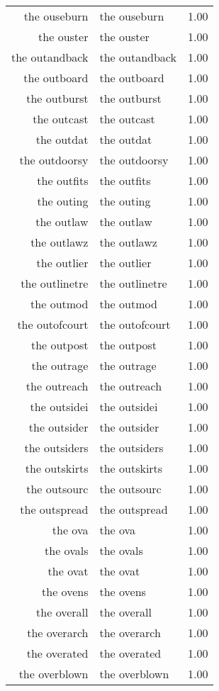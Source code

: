 \begin{table}[ht]
\begin{tabular}{rlr}
  the ouseburn & the ouseburn & 1.00 \\ 
  the ouster & the ouster & 1.00 \\ 
  the outandback & the outandback & 1.00 \\ 
  the outboard & the outboard & 1.00 \\ 
  the outburst & the outburst & 1.00 \\ 
  the outcast & the outcast & 1.00 \\ 
  the outdat & the outdat & 1.00 \\ 
  the outdoorsy & the outdoorsy & 1.00 \\ 
  the outfits & the outfits & 1.00 \\ 
  the outing & the outing & 1.00 \\ 
  the outlaw & the outlaw & 1.00 \\ 
  the outlawz & the outlawz & 1.00 \\ 
  the outlier & the outlier & 1.00 \\ 
  the outlinetre & the outlinetre & 1.00 \\ 
  the outmod & the outmod & 1.00 \\ 
  the outofcourt & the outofcourt & 1.00 \\ 
  the outpost & the outpost & 1.00 \\ 
  the outrage & the outrage & 1.00 \\ 
  the outreach & the outreach & 1.00 \\ 
  the outsidei & the outsidei & 1.00 \\ 
  the outsider & the outsider & 1.00 \\ 
  the outsiders & the outsiders & 1.00 \\ 
  the outskirts & the outskirts & 1.00 \\ 
  the outsourc & the outsourc & 1.00 \\ 
  the outspread & the outspread & 1.00 \\ 
  the ova & the ova & 1.00 \\ 
  the ovals & the ovals & 1.00 \\ 
  the ovat & the ovat & 1.00 \\ 
  the ovens & the ovens & 1.00 \\ 
  the overall & the overall & 1.00 \\ 
  the overarch & the overarch & 1.00 \\ 
  the overated & the overated & 1.00 \\ 
  the overblown & the overblown & 1.00 \\ 

\end{tabular}
\end{table}
